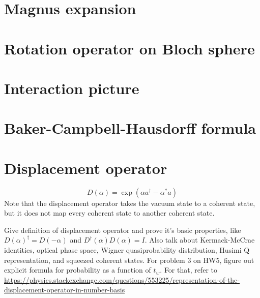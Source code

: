 \documentclass{article}
\begin{document}
\section{Magnus expansion}
\section{Rotation operator on Bloch sphere}
\section{Interaction picture}
\section{Baker-Campbell-Hausdorff formula}
\section{Displacement operator}
\[ D(\alpha) = \exp \left( \alpha a^\dag -\alpha^* a \right)  \]
Note that the displacement operator takes the vacuum state to a coherent state, but it does not map every coherent state to another coherent state.
\par
Give definition of displacement operator and prove it's basic properties, like $D(\alpha)^\dag = D(-\alpha)$ and $D^\dag(\alpha)D(\alpha)=I$. Also talk about Kermack-McCrae identities, optical phase space, Wigner quasiprobability distribution, Husimi Q representation, and squeezed coherent states. For problem 3 on HW5, figure out explicit formula for probability as a function of $t_w$. For that, refer to \url{https://physics.stackexchange.com/questions/553225/representation-of-the-displacement-operator-in-number-basis}
\end{document}
